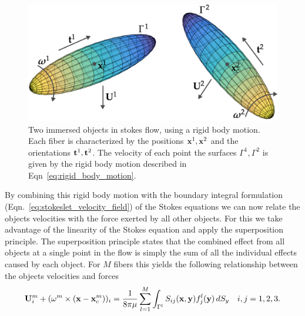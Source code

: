 \begin{figure}[!htbp]
  \centering
  \includegraphics[width=.8\textwidth]{img/immersed_rigid.png}
  \caption[Two immersed objects in stokes flow.]{Two immersed objects in stokes flow, using a rigid body motion. Each fiber is characterized by the positions $\mathbf{x}^1, \mathbf{x}^2$ and the orientations $\mathbf{t}^1,\mathbf{t}^2$. The velocity of each point the surfaces $\Gamma^1, \Gamma^2$ is given by the rigid body motion described in Eqn~\eqref{eq:rigid_body_motion}.}
  \label{fig:immersed_rigid}
\end{figure}

By combining this rigid body motion with the boundary integral formulation (Eqn.~\eqref{eq:stokeslet_velocity_field}) of the Stokes equations we can now relate the objects velocities with the force exerted by all other objects. For this we take advantage of the linearity of the Stokes equation and apply the superposition principle. The superposition principle states that the combined effect from all objects at a single point in the flow is simply the sum of all the individual effects caused by each object. For $M$ fibers this yields the following relationship between the objects velocities and forces
\begin{equation}
  \label{eq:objects_boundary}
	\mathbf{U}_i^m + (\mathbf{\omega}^m \times (\mathbf{x} - \mathbf{x}_c^m))_i = \frac{1}{8 \pi \mu} \sum_{l=1}^{M} \int_{\Gamma^l} S_{ij}(\mathbf{x},\mathbf{y})f_j^l(\mathbf{y}) \, dS_y \quad i,j =1,2,3 \text{.}
\end{equation}


